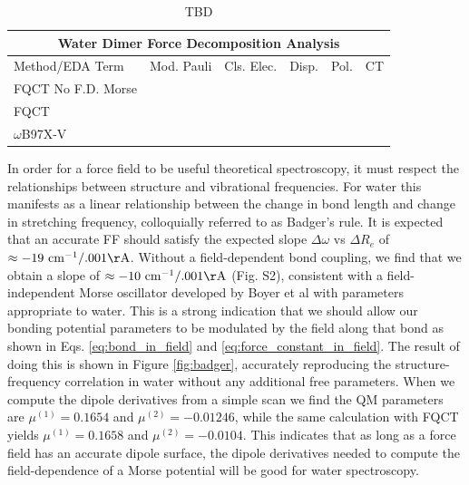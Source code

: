 \documentclass[journal=jctcce,manuscript=article]{achemso}
\begin{document}
\begin{table}[ht!]
  \begin{center}
  \begin{tabular}{lccccc}
      \multicolumn{6}{c}{Water Dimer Force Decomposition Analysis} \\\hline
       Method/EDA Term & Mod. Pauli & Cls. Elec. & Disp. & Pol. & CT \\\hline
       FQCT No F.D. Morse & & & & & \\
       FQCT & & & & & \\
       $\omega$B97X-V & & & & & \\\hline
  \end{tabular}
  \end{center}
  \caption{TBD}
  \label{tab:dimer_forces}
\end{table}

In order for a force field to be useful theoretical spectroscopy, it must respect the relationships
between structure and vibrational frequencies. For water this manifests as a linear
relationship between the change in bond length and change in  stretching frequency\cite{boyer2019beyond}, colloquially referred to as Badger's rule.\cite{badger1934relation} It is expected that an accurate FF should satisfy the expected slope
$\Delta\omega$ vs $\Delta R_e$ of $\approx -19\ \mathrm{cm^{-1}/.001\AA}$\cite{boyer2019beyond}. Without a field-dependent bond coupling, we find that 
we obtain a slope of $\approx -10\ \mathrm{cm^{-1}/.001\AA}$ (Fig. S2), consistent with a field-independent Morse
oscillator developed by Boyer et al with parameters appropriate to water.\cite{boyer2019beyond} This is a strong indication that we should allow our bonding potential parameters to be modulated by the field along that bond as shown in Eqs. \ref{eq:bond_in_field} and \ref{eq:force_constant_in_field}. The result of doing this is shown in Figure \ref{fig:badger}, accurately reproducing the structure-frequency correlation
in water without any additional free parameters. When we compute the dipole derivatives from a simple  scan we find the QM parameters are $\mu^{(1)}=0.1654$ and $\mu^{(2)}=-0.01246$, while the same calculation with FQCT yields $\mu^{(1)}=0.1658$ and $\mu^{(2)}=-0.0104$. This indicates that as
long as a force field has an accurate dipole surface, the dipole derivatives needed to compute
the field-dependence of a Morse potential will be good for water spectroscopy.
\end{document}
